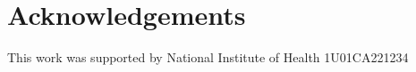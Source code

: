 \documentclass{bioinfo}
\begin{document}
\maketitle











\section{Acknowledgements}
    This work was supported by National Institute of Health 1U01CA221234




\end{document}
